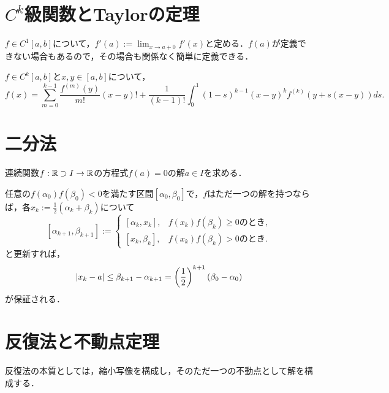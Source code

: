 \documentclass[uplatex, dvipdfmx]{jsreport}
\begin{document}
\section{$C^k$級関数とTaylorの定理}

\begin{definition}[境界での微分係数は連続補完する]
    $f\in C^1[a,b]$について，$f'(a):=\lim_{x\to a+0}f'(x)$と定める．$f(a)$が定義できない場合もあるので，その場合も関係なく簡単に定義できる．
\end{definition}

\begin{theorem}
    $f\in C^k[a,b]$と$x,y\in [a,b]$について，
    \[f(x)=\sum^{k-1}_{m=0}\frac{f^{(m)}(y)}{m!}(x-y)!+\frac{1}{(k-1)!}\int^1_0(1-s)^{k-1}(x-y)^kf^{(k)}(y+s(x-y))ds.\]
\end{theorem}

\section{二分法}

\begin{problem}
    連続関数$f:\mathbb{R}\supset I\to\mathbb{R}$の方程式$f(a)=0$の解$a\in I$を求める．
\end{problem}
\begin{discussion}[中間値の定理の証明抽出]
    任意の$f(\alpha_0)f(\beta_0)<0$を満たす区間$[\alpha_0,\beta_0]$で，$f$はただ一つの解を持つならば，各$x_k:=\frac{1}{2}(\alpha_k+\beta_k)$について
    \[[\alpha_{k+1},\beta_{k+1}]:=\begin{cases}
        [\alpha_k,x_k],&f(x_k)f(\beta_k)\ge 0のとき,\\
        [x_k,\beta_k],&f(x_k)f(\beta_k)>0のとき.
    \end{cases}\]
    と更新すれば，
    \[\lvert x_k-a\rvert\le\beta_{k+1}-\alpha_{k+1}=\left(\frac{1}{2}\right)^{k+1}(\beta_0-\alpha_0)\]
    が保証される．
\end{discussion}

\section{反復法と不動点定理}

\begin{tcolorbox}[colframe=ForestGreen, colback=ForestGreen!10!white,breakable,colbacktitle=ForestGreen!40!white,coltitle=black,fonttitle=\bfseries\sffamily,
title=]
    反復法の本質としては，縮小写像を構成し，そのただ一つの不動点として解を構成する．
\end{tcolorbox}
\end{document}
